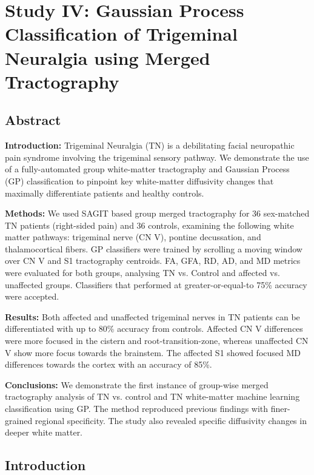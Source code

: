 \graphicspath{{images/tn-gp-sagit/drafts/}}

\chapter{Study IV: Gaussian Process Classification of Trigeminal Neuralgia using Merged Tractography}
\label{section:study4}

\section{Abstract}
\textbf{Introduction:} Trigeminal Neuralgia (TN) is a debilitating facial neuropathic pain syndrome involving the trigeminal sensory pathway. We demonstrate the use of a fully-automated group white-matter tractography and Gaussian Process (GP) classification to pinpoint key white-matter diffusivity changes that maximally differentiate patients and healthy controls. 

\textbf{Methods:} We used SAGIT based group merged tractography for 36 sex-matched TN patients (right-sided pain) and 36 controls, examining the following white matter pathways: trigeminal nerve (CN V), pontine decussation, and thalamocortical fibers. GP classifiers were trained by scrolling a moving window over CN V and S1 tractography centroids. FA, GFA, RD, AD, and MD metrics were evaluated for both groups, analysing TN vs. Control and affected vs. unaffected groups. Classifiers that performed at greater-or-equal-to 75\% accuracy were accepted.

\textbf{Results:} Both affected and unaffected trigeminal nerves in TN patients can be differentiated with up to 80\% accuracy from controls. Affected CN V differences were more focused in the cistern and root-transition-zone, whereas unaffected CN V show more focus towards the brainstem. The affected S1 showed focused MD differences towards the cortex with an accuracy of 85\%. 

\textbf{Conclusions:} We  demonstrate the first instance of group-wise merged tractography analysis of TN vs. control and TN white-matter machine learning classification using GP. The method reproduced previous findings with finer-grained regional specificity. The study also revealed specific diffusivity changes in deeper white matter.

\section{Introduction}

